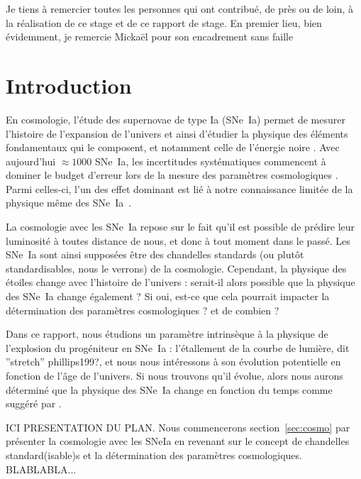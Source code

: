 \documentclass[a4paper, 12pt, svgnames]{article}
\newcommand{\mr}[1]{{\textcolor[rgb]{0.80,0.10,0.1}{#1}}}
\begin{document}

Je tiens à remercier toutes les personnes qui ont contribué, de près ou de loin,
à la réalisation de ce stage et de ce rapport de stage. En premier lieu, bien
évidemment, je remercie Mickaël  pour son encadrement sans faille

\tableofcontents
\newpage

\section{Introduction}\label{sec:int}

En cosmologie, l'étude des supernovae de type Ia (SNe~Ia) permet de mesurer
l'histoire de l'expansion de l'univers et ainsi d'étudier la physique des
éléments fondamentaux qui le composent, et notamment celle de l'énergie noire
\cite{perlmutter_measurements_1999, riess_observational_1998}. Avec aujourd'hui
$\approx1000$ SNe~Ia, les incertitudes systématiques commencent à dominer le
budget d'erreur lors de la mesure des paramètres cosmologiques
\cite{betoule_improved_2014, scolnic_complete_2018}. Parmi celles-ci, l'un des
effet dominant est lié à notre connaissance limitée de la physique même des
SNe~Ia~\cite{sullivan_dependence_2010, rigault_evidence_2013,
rigault_confirmation_2015}.

La cosmologie avec les SNe~Ia repose sur le fait qu'il est possible de prédire
leur luminosité à toutes distance de nous, et donc à tout moment dans le passé.
Les SNe~Ia sont ainsi supposées être des chandelles standards (ou plutôt
standardisables, nous le verrons) de la cosmologie. Cependant, la physique des
étoiles change avec l'histoire de l'univers : serait-il alors possible que la
physique des SNe~Ia change également ? Si oui, est-ce que cela pourrait impacter
la détermination des paramètres cosmologiques ? et de combien ?

Dans ce rapport, nous étudions un paramètre intrinsèque à la physique
de l'explosion du progéniteur en SNe~Ia : l'étallement de la courbe de lumière,
dit ”stretch” \mr{phillips199?}, et nous nous intéressons à son évolution
potentielle en fonction de l'âge de l'univers. Si nous trouvons qu'il évolue,
alors nous aurons déterminé que la physique des SNe~Ia change en fonction du
temps comme suggéré par
\cite{howell_effect_2009, rigault_evidence_2013, childress_ages_2014,
rigault_strong_2018}.

\mr{ICI PRESENTATION DU PLAN. Nous commencerons section~\ref{sec:cosmo} par
présenter la cosmologie avec les SNeIa en revenant sur le concept de chandelles
standard(isable)s et la détermination des paramètres cosmologiques.
BLABLABLA...}
\end{document}
